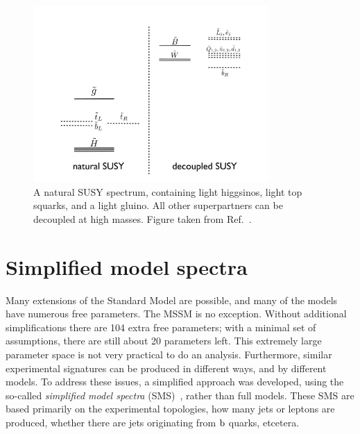 \begin{figure}[t]
  \centering
  \includegraphics[width=0.8\textwidth]{figures/susy/NaturalSpec}
  \caption{ A natural SUSY spectrum, containing light higgsinos, light top squarks, and a light
gluino. All other superpartners can be decoupled at high masses. Figure taken from
Ref.~\cite{Papucci:2011wy}.
  \label{fig:natural_spectrum}}
\end{figure}



\section{Simplified model spectra \label{sec:susy_sms}}

Many extensions of the Standard Model are possible, and many of the models have numerous free
parameters. The MSSM is no exception. Without additional simplifications there are 104 extra free
parameters; with a minimal set of assumptions, there are still about 20 parameters left. This
extremely large parameter space is not very practical to do an analysis. 
Furthermore, similar experimental signatures can be produced in different ways, and by different
models.
To address these issues, a simplified approach was developed, using the so-called
\textit{simplified model spectra} (SMS)~\cite{Alves:2011wf,Alwall:2008ag,Chatrchyan:2013sza},
rather than full models. These SMS are based primarily on the experimental topologies, how many jets
or leptons are produced, whether there are jets originating from $\mathrm{b}$ quarks, etcetera. 

